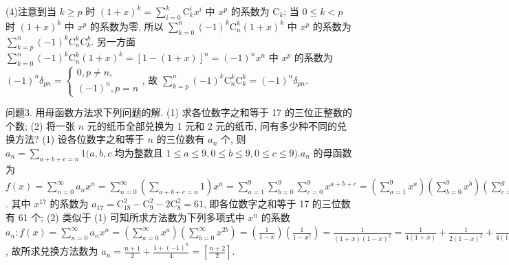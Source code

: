 (4)注意到当 $k \geqslant p$ 时 $(1+x)^k=\sum_{i=0}^k \mathrm{C}_k^i x^i$ 中 $x^p$ 的系数为 $\mathrm{C}_k$; 当 $0 \leqslant k<p$ 时 $(1+x)^k$ 中 $x^p$ 的系数为零, 所以 $\sum_{k=0}^n(-1)^k \mathrm{C}_n^k(1+x)^k$ 中 $x^p$ 的系数为 $\sum_{k=p}^n(-1)^k \mathrm{C}_n^k \mathrm{C}_k^k$. 另一方面 $\sum_{k=0}^n(-1)^k \mathrm{C}_n^k(1+x)^k=[1-(1+x)]^n=(-1)^n x^n$ 中 $x^p$ 的系数为 $(-1)^n \delta_{p n}=\left\{\begin{array}{l}0, p \neq n, \\ (-1)^n, p=n\end{array}\right.$, 故 $\sum_{k=p}^n(-1)^k \mathrm{C}_n^k \mathrm{C}_k^k=(-1)^n \delta_{p n}$.



问题3. 用母函数方法求下列问题的解.
(1) 求各位数字之和等于 17 的三位正整数的个数;
(2) 将一张 $n$ 元的纸币全部兑换为 1 元和 2 元的纸币, 问有多少种不同的兑换方法?
(1) 设各位数字之和等于 $n$ 的三位数有 $a_n$ 个, 则 $a_n=\sum_{a+b+c=n} 1(a, b, c$ 均为整数且 $1 \leqslant a \leqslant 9,0 \leqslant b \leqslant 9,0 \leqslant c \leqslant 9) . a_n$ 的母函数为 $f(x)=\sum_{n=0}^{\infty} a_n x^n= \sum_{n=0}^{\infty}\left(\sum_{a+b+c=n} 1\right) x^n=\sum_{a=1}^9 \sum_{b=0}^9 \sum_{c=0}^9 x^{a+b+c}=\left(\sum_{a=1}^9 x^a\right)\left(\sum_{b=0}^9 x^b\right)\left(\sum_{c=0}^g x^c\right)= \frac{x\left(1-x^9\right)\left(1-x^{10}\right)^2}{(1-x)^3}=\left(x-x^{10}-2 x^{11}+2 x^{20}+x^{21}-x^{30}\right)\left(\sum_{i=0}^{\infty} \mathrm{C}_{i+2}^2 x^i\right)$. 其中 $x^{17}$ 的系数为 $a_{17}=\mathrm{C}_{18}^2-\mathrm{C}_9^2-2 \mathrm{C}_8^2=61$, 即各位数字之和等于 17 的三位数有 61 个; (2) 类似于 (1) 可知所求方法数为下列多项式中 $x^n$ 的系数 $a_n: f(x)=\sum_{n=0}^{\infty} a_n x^n=\left(\sum_{a=0}^{\infty} x^a\right)\left(\sum_{b=0}^{\infty} x^{2 b}\right)=\left(\frac{1}{1-x}\right)\left(\frac{1}{1-x^2}\right)= \frac{1}{(1+x)(1-x)^2}=\frac{1}{4(1+x)}+\frac{1}{2(1-x)^2}+\frac{1}{4(1-x)}=\frac{1}{4} \sum_{n=0}^{\infty}(-1)^n x^n+ \frac{1}{2} \sum_{n=0}^{\infty} \mathrm{C}_{n+1}^1 x^n+\frac{1}{4} \sum_{n=0}^{\infty} x^n=\sum_{n=0}^{\infty}\left(\frac{n+1}{2}+\frac{1+(-1)^n}{4}\right) x^n$, 故所求兑换方法数为 $a_n=\frac{n+1}{2}+\frac{1+(-1)^n}{4}=\left[\frac{n+2}{2}\right]$.


